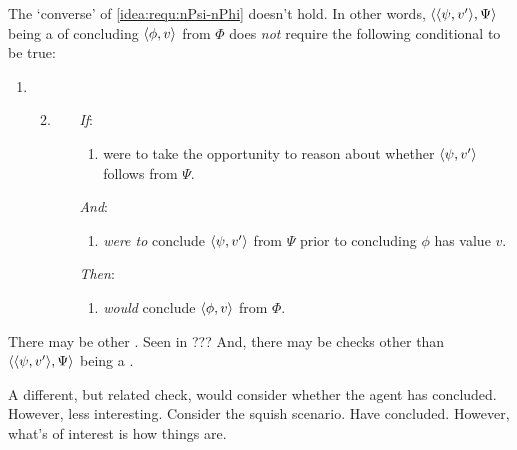 \begin{note}
  The `converse' of \ref{idea:requ:nPsi-nPhi} doesn't hold.
  In other words, \(\langle \langle \psi, v' \rangle, \Psi \rangle\) being a \requ{} of concluding \(\langle \phi, v \rangle\) from \(\Phi\) does \emph{not} require the following conditional to be true:
  \begin{enumerate}[label=]
  \item
    \begin{enumerate}[label=]
      \setcounter{enumi}{1}
    \item
      \label{idea:requ:nPsi-nPhi:conv}
      \begin{enumerate}
      \item[\emph{If}:]
        \begin{enumerate}[label=\alph*., ref=\named{R:b.\alph*}]
        \item
          \vAgent{} were to take the opportunity to reason about whether \(\langle \psi, v' \rangle\) follows from \(\Psi\).
        \end{enumerate}
      \item[\emph{And}:]
        \begin{enumerate}[label=\alph*., ref=\named{R:b.\alph*}, resume]
        \item
          \vAgent{} \emph{were to} conclude \(\langle \psi, v' \rangle\) from \(\Psi\) prior to concluding \(\phi\) has value \(v\).
        \end{enumerate}
      \item[\emph{Then}:]
        \begin{enumerate}[label=\alph*., ref=\named{R:b.\alph*}, resume]
        \item
          \vAgent{} \emph{would} conclude \(\langle \phi, v \rangle\) from \(\Phi\).
        \end{enumerate}
      \end{enumerate}
    \end{enumerate}
  \end{enumerate}

  There may be other \requ{}.
  {
    \color{red}
    Seen in ???
  }
  And, there may be checks other than \(\langle \langle \psi, v' \rangle, \Psi \rangle\) being a \requ{}.

  A different, but related check, would consider whether the agent has concluded.
  However, less interesting.
  Consider the squish scenario.
  Have concluded.
  However, what's of interest is how things are.
\end{note}

